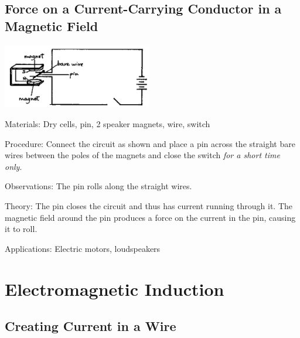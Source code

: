 \begin{multicols}{2}
\subsection{Force on a Current-Carrying Conductor in a Magnetic Field}

\begin{center}
\includegraphics[width=0.49\textwidth]{./img/source/force-wire.png}
\end{center}

\begin{description*}
\item[Materials:]{Dry cells, pin, 2 speaker magnets, wire, switch}
\item[Procedure:]{Connect the circuit as shown and place a pin across the straight bare wires between the poles of the magnets and close the switch \emph{for a short time only}.}
\item[Observations:]{The pin rolls along the straight wires.}
\item[Theory:]{The pin closes the circuit and thus has current running through it. The magnetic field around the pin produces a force on the current in the pin, causing it to roll.}
\item[Applications:]{Electric motors, loudspeakers}
\end{description*}


\section*{Electromagnetic Induction}


\subsection{Creating Current in a Wire} %


\end{multicols}
